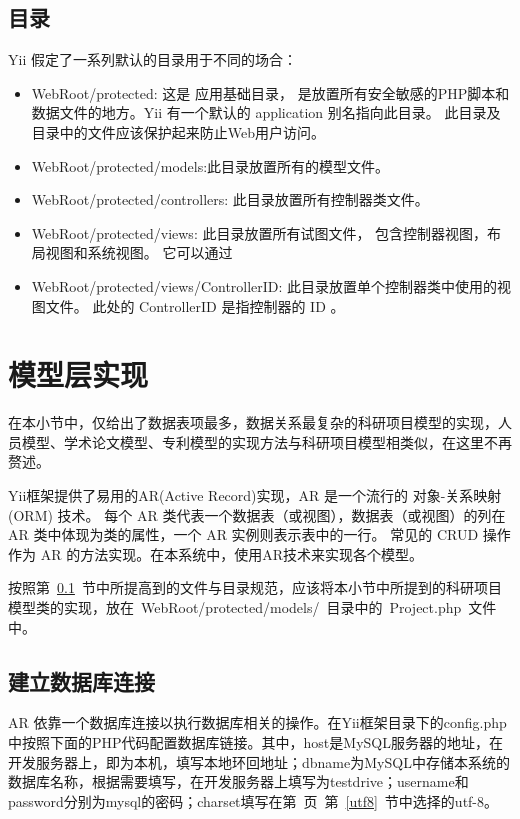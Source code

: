 \subsection{目录}
\label{yiiprotocoldir}

Yii 假定了一系列默认的目录用于不同的场合：
\begin{itemize}
\item WebRoot/protected: 这是 应用基础目录， 是放置所有安全敏感的PHP脚本和数据文件的地方。Yii 有一个默认的 application 别名指向此目录。 此目录及目录中的文件应该保护起来防止Web用户访问。
\item WebRoot/protected/models:此目录放置所有的模型文件。
\item WebRoot/protected/controllers: 此目录放置所有控制器类文件。
\item WebRoot/protected/views: 此目录放置所有试图文件， 包含控制器视图，布局视图和系统视图。 它可以通过
\item WebRoot/protected/views/ControllerID: 此目录放置单个控制器类中使用的视图文件。 此处的 ControllerID 是指控制器的 ID 。
\end{itemize}

\section{模型层实现}

在本小节中，仅给出了数据表项最多，数据关系最复杂的科研项目模型的实现，人员模型、学术论文模型、专利模型的实现方法与科研项目模型相类似，在这里不再赘述。

Yii框架提供了易用的AR(Active Record)实现，AR 是一个流行的 对象-关系映射 (ORM) 技术。 每个 AR 类代表一个数据表（或视图），数据表（或视图）的列在 AR 类中体现为类的属性，一个 AR 实例则表示表中的一行。 常见的 CRUD 操作作为 AR 的方法实现。在本系统中，使用AR技术来实现各个模型。

按照第~\ref{yiiprotocoldir}~节中所提高到的文件与目录规范，应该将本小节中所提到的科研项目模型类的实现，放在~WebRoot/protected/models/~目录中的~Project.php~文件中。

\subsection{建立数据库连接}

AR 依靠一个数据库连接以执行数据库相关的操作。在Yii框架目录下的config.php中按照下面的PHP代码配置数据库链接。其中，host是MySQL服务器的地址，在开发服务器上，即为本机，填写本地环回地址；dbname为MySQL中存储本系统的数据库名称，根据需要填写，在开发服务器上填写为testdrive；username和password分别为mysql的密码；charset填写在第~\pageref{utf8}页~第~\ref{utf8}~节中选择的utf-8。

